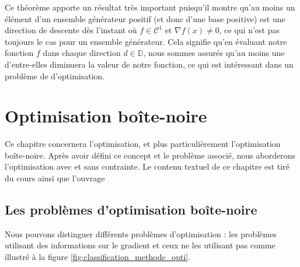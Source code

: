 \documentclass[french]{report}
\newcommand{\D}{\mathbb{D}}
\begin{document}
Ce théorème apporte un résultat très important puisqu'il montre qu'au moins un élément d'un ensemble générateur positif (et donc d'une base positive) est une direction de descente dès l'instant où $f \in \mathcal{C}^1$ et $\nabla f(x) \neq 0$, ce qui n'est pas toujours le cas pour un ensemble générateur. Cela signifie qu'en évaluant notre fonction $f$ dans chaque direction $d \in \D$, nous sommes assurés qu'au moins une d'entre-elles diminuera la valeur de notre fonction, ce qui est intéressant dans un problème de d'optimisation.






\chapter{Optimisation boîte-noire}

Ce chapitre concernera l'optimisation, et plus particulièrement l'optimisation boîte-noire. Après avoir défini ce concept et le problème associé, nous aborderons l'optimisation avec et sans contrainte. Le contenu textuel de ce chapitre est tiré du cours \cite{coursFranco} ainsi que l'ouvrage \cite{AuHa2017a}

\section{Les problèmes d'optimisation boîte-noire}


Nous pouvons distinguer différents problèmes d'optimisation : les problèmes utilisant des informations sur le gradient et ceux ne les utilisant pas comme illustré à la figure \ref{fig:classification_methode_opti}.
\end{document}

